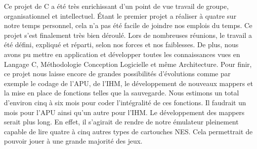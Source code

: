 Ce projet de C a été très enrichissant d'un point de vue travail de groupe, organisationnel et intellectuel. Étant le premier projet a réaliser à quatre sur notre temps personnel, cela n'a pas été facile de joindre nos emplois du temps. Ce projet s'est finalement très bien déroulé. Lors de nombreuses réunions, le travail a été défini, expliqué et réparti, selon nos forces et nos faiblesses. De plus, nous avons pu mettre en application et développer toutes les connaissances vues en Langage C, Méthodologie Conception Logicielle et même Architecture. Pour finir, ce projet nous laisse encore de grandes possibilités d'évolutions comme par exemple le codage de l'APU, de l'IHM, le développement de nouveaux mappers et la mise en place de fonctions telles que la sauvegarde. Nous estimons un total d'environ cinq à six mois pour coder l'intégralité de ces fonctions. Il faudrait un mois pour l'APU ainsi qu'un autre pour l'IHM. Le développement des mappers serait plus long. En effet, il s'agirait de rendre de notre émulateur pleinement capable de lire quatre à cinq autres types de cartouches NES. Cela permettrait de pouvoir jouer à une grande majorité des jeux.
